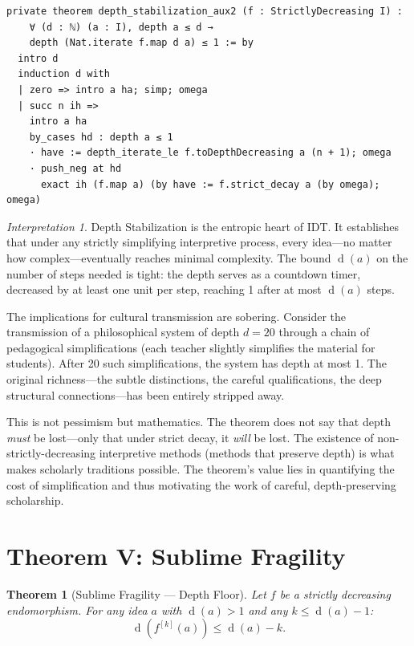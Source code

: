 \documentclass[11pt,openany]{book}
\theoremstyle{definition}
\theoremstyle{plain}
\newtheorem{theorem}[axiom]{Theorem}
\theoremstyle{remark}
\newtheorem{interpretation}[axiom]{Interpretation}
\newcommand{\depth}{\operatorname{d}}       %
\begin{document}
\begin{lstlisting}
private theorem depth_stabilization_aux2 (f : StrictlyDecreasing I) :
    ∀ (d : ℕ) (a : I), depth a ≤ d →
    depth (Nat.iterate f.map d a) ≤ 1 := by
  intro d
  induction d with
  | zero => intro a ha; simp; omega
  | succ n ih =>
    intro a ha
    by_cases hd : depth a ≤ 1
    · have := depth_iterate_le f.toDepthDecreasing a (n + 1); omega
    · push_neg at hd
      exact ih (f.map a) (by have := f.strict_decay a (by omega); omega)
\end{lstlisting}

\begin{interpretation}
Depth Stabilization is the entropic heart of IDT. It establishes that under any strictly simplifying interpretive process, every idea---no matter how complex---eventually reaches minimal complexity. The bound $\depth(a)$ on the number of steps needed is tight: the depth serves as a countdown timer, decreased by at least one unit per step, reaching 1 after at most $\depth(a)$ steps.

The implications for cultural transmission are sobering. Consider the transmission of a philosophical system of depth $d = 20$ through a chain of pedagogical simplifications (each teacher slightly simplifies the material for students). After 20 such simplifications, the system has depth at most 1. The original richness---the subtle distinctions, the careful qualifications, the deep structural connections---has been entirely stripped away.

This is not pessimism but mathematics. The theorem does not say that depth \emph{must} be lost---only that under strict decay, it \emph{will} be lost. The existence of non-strictly-decreasing interpretive methods (methods that preserve depth) is what makes scholarly traditions possible. The theorem's value lies in quantifying the cost of simplification and thus motivating the work of careful, depth-preserving scholarship.
\end{interpretation}

\section{Theorem V: Sublime Fragility}

\begin{theorem}[Sublime Fragility --- Depth Floor]
\label{thm:key-sublime}
Let $f$ be a strictly decreasing endomorphism. For any idea $a$ with $\depth(a) > 1$ and any $k \leq \depth(a) - 1$:
\[
\depth(f^{[k]}(a)) \leq \depth(a) - k.
\]
\end{theorem}
\end{document}
